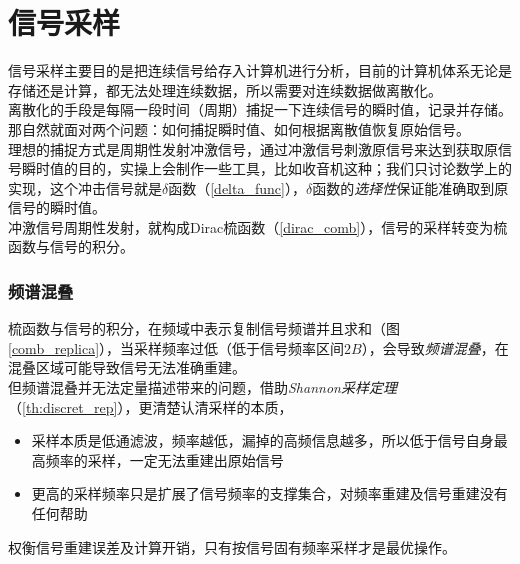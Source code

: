 \section{信号采样}

信号采样主要目的是把连续信号给存入计算机进行分析，目前的计算机体系无论是存储还是计算，都无法处理连续数据，所以需要对连续数据做离散化。\\

离散化的手段是每隔一段时间（周期）捕捉一下连续信号的瞬时值，记录并存储。那自然就面对两个问题：如何捕捉瞬时值、如何根据离散值恢复原始信号。\\

理想的捕捉方式是周期性发射冲激信号，通过冲激信号刺激原信号来达到获取原信号瞬时值的目的，实操上会制作一些工具，比如收音机这种；我们只讨论数学上的实现，这个冲击信号就是$\delta$函数（\ref{delta_func}），$\delta$函数的\textit{选择性}保证能准确取到原信号的瞬时值。\\

冲激信号周期性发射，就构成Dirac梳函数（\ref{dirac_comb}），信号的采样转变为梳函数与信号的积分。

\subsubsection*{频谱混叠}

梳函数与信号的积分，在频域中表示复制信号频谱并且求和（图\ref{comb_replica}），当采样频率过低（低于信号频率区间$2B$），会导致\textit{频谱混叠}，在混叠区域可能导致信号无法准确重建。\\

但频谱混叠并无法定量描述带来的问题，借助\textit{Shannon采样定理}（\ref{th:discret_rep}），更清楚认清采样的本质，
\begin{itemize}
	\item 采样本质是低通滤波，频率越低，漏掉的高频信息越多，所以低于信号自身最高频率的采样，一定无法重建出原始信号
	\item 更高的采样频率只是扩展了信号频率的支撑集合，对频率重建及信号重建没有任何帮助
\end{itemize}

权衡信号重建误差及计算开销，只有按信号固有频率采样才是最优操作。
